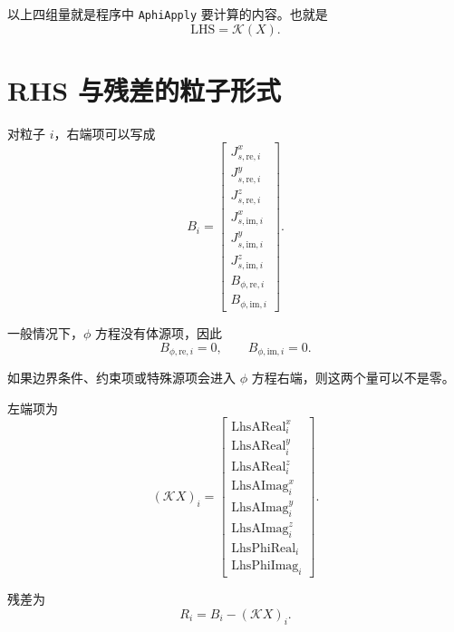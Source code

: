 \documentclass[UTF8,11pt]{ctexart}
\begin{document}
以上四组量就是程序中 \texttt{AphiApply} 要计算的内容。也就是
\begin{equation}
    \mathrm{LHS} = \mathcal{K}(X).
\end{equation}

\section{RHS 与残差的粒子形式}

对粒子 $i$，右端项可以写成
\begin{equation}
    B_i
    =
    \begin{bmatrix}
    J^x_{s,\mathrm{re},i}\\
    J^y_{s,\mathrm{re},i}\\
    J^z_{s,\mathrm{re},i}\\
    J^x_{s,\mathrm{im},i}\\
    J^y_{s,\mathrm{im},i}\\
    J^z_{s,\mathrm{im},i}\\
    B_{\phi,\mathrm{re},i}\\
    B_{\phi,\mathrm{im},i}
    \end{bmatrix}.
\end{equation}

一般情况下，$\phi$ 方程没有体源项，因此
\begin{equation}
    B_{\phi,\mathrm{re},i}=0,
    \qquad
    B_{\phi,\mathrm{im},i}=0.
\end{equation}

如果边界条件、约束项或特殊源项会进入 $\phi$ 方程右端，则这两个量可以不是零。

左端项为
\begin{equation}
    (\mathcal{K}X)_i
    =
    \begin{bmatrix}
    \mathrm{LhsAReal}_i^x\\
    \mathrm{LhsAReal}_i^y\\
    \mathrm{LhsAReal}_i^z\\
    \mathrm{LhsAImag}_i^x\\
    \mathrm{LhsAImag}_i^y\\
    \mathrm{LhsAImag}_i^z\\
    \mathrm{LhsPhiReal}_i\\
    \mathrm{LhsPhiImag}_i
    \end{bmatrix}.
\end{equation}

残差为
\begin{equation}
    R_i
    =
    B_i
    -
    (\mathcal{K}X)_i .
\end{equation}
\end{document}
